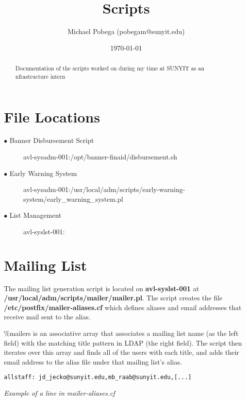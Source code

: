 \documentclass[a4paper]{article}
\title{Scripts}
\author{Michael Pobega (pobegam@sunyit.edu)}
\date{\today}
\begin{document}
\begin{titlepage}
\clearpage\maketitle
\thispagestyle{empty}

\begin{abstract}
Documentation of the scripts worked on during my time at SUNYIT as an nfrastructure intern
\end{abstract}

\clearpage
\thispagestyle{empty}
\tableofcontents
\end{titlepage}
\clearpage

\section{File Locations}
\label{sec:loc}
\begin{description}
  \item[$\bullet$ Banner Disbursement Script] avl-sysadm-001:/opt/banner-finaid/disbursement.sh
  \item[$\bullet$ Early Warning System] avl-sysadm-001:/usr/local/adm/scripts/early-warning-system/early\_warning\_system.pl
  \item[$\bullet$ List Management] avl-syslst-001:
\end{description}

\section{Mailing List}

The mailing list generation script is located on \textbf{avl-syslst-001} at \textbf{/usr/local/adm/scripts/mailer/mailer.pl}. The script creates the file \textbf{/etc/postfix/mailer-aliases.cf} which defines aliases and email addresses that receive mail sent to the alias.

\%mailers is an associative array that associates a mailing list name (as the left field) with the matching title pattern in LDAP (the right field). The script then iterates over this array and finds all of the users with each title, and adds their email address to the alias file under that mailing list's alias.
\\
\begin{lstlisting}
allstaff: jd_jecko@sunyit.edu,mb_raab@sunyit.edu,[...]
\end{lstlisting}
\hfill\textit{Example of a line in mailer-aliases.cf}\\
\end{document}
